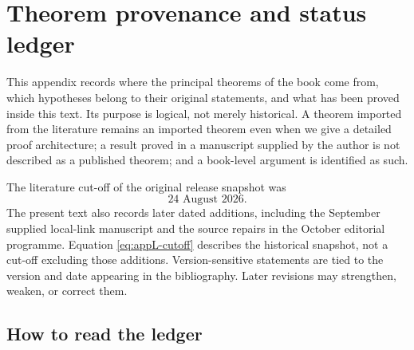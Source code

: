 \chapter{Theorem provenance and status ledger}
\label{app:provenance}

This appendix records where the principal theorems of the book come from,
which hypotheses belong to their original statements, and what has been
proved inside this text.  Its purpose is logical, not merely historical.
A theorem imported from the literature remains an imported theorem even when
we give a detailed proof architecture; a result proved in a manuscript
supplied by the author is not described as a published theorem; and a book-level
argument is identified as such.

The literature cut-off of the original release snapshot was
\[
                         \text{24 August 2026}.
\tag{L.1}\label{eq:appL-cutoff}
\]
The present text also records later dated additions, including the
September supplied local-link manuscript and the source repairs in the
October editorial programme. Equation \eqref{eq:appL-cutoff} describes
the historical snapshot, not a cut-off excluding those additions.
Version-sensitive statements are tied to the version and date appearing in
the bibliography.  Later revisions may strengthen, weaken, or correct them.

\newcommand{\AppLFirstField}{}
\newcommand{\AppLSecondField}{}
\newcommand{\AppLThirdField}{}
\newenvironment{AppLProvenanceLedger}[3]{%
  \par\medskip
  \renewcommand{\AppLFirstField}{#1}%
  \renewcommand{\AppLSecondField}{#2}%
  \renewcommand{\AppLThirdField}{#3}%
}{%
  \par\medskip
}
\newcommand{\AppLProvenanceRecord}[3]{%
  \par\addvspace{.8\baselineskip}%
  \noindent\textbf{\AppLFirstField.} #1\par\nobreak
  \noindent\emph{\AppLSecondField.} #2\par\nobreak
  \noindent\emph{\AppLThirdField.} #3\par
}

\section{How to read the ledger}
\label{sec:appL-how}

